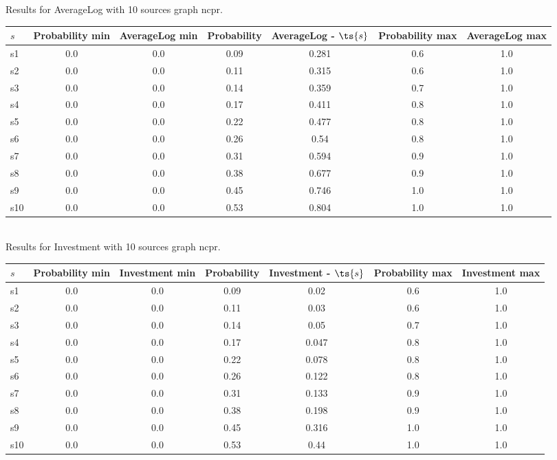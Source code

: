 \documentclass{article}
\begin{document}
\noindent Results for AverageLog with 10 sources graph ncpr.

\noindent\begin{tabular}{|l|c|c|c|c|c|c|}
\hline
$s$& Probability min & AverageLog min & Probability & AverageLog - $\ts{s}$ & Probability max & AverageLog max\\
\hline
s1 &0.0 & 0.0 & 0.09 & 0.281 & 0.6 & 1.0\\
\hline
s2 &0.0 & 0.0 & 0.11 & 0.315 & 0.6 & 1.0\\
\hline
s3 &0.0 & 0.0 & 0.14 & 0.359 & 0.7 & 1.0\\
\hline
s4 &0.0 & 0.0 & 0.17 & 0.411 & 0.8 & 1.0\\
\hline
s5 &0.0 & 0.0 & 0.22 & 0.477 & 0.8 & 1.0\\
\hline
s6 &0.0 & 0.0 & 0.26 & 0.54 & 0.8 & 1.0\\
\hline
s7 &0.0 & 0.0 & 0.31 & 0.594 & 0.9 & 1.0\\
\hline
s8 &0.0 & 0.0 & 0.38 & 0.677 & 0.9 & 1.0\\
\hline
s9 &0.0 & 0.0 & 0.45 & 0.746 & 1.0 & 1.0\\
\hline
s10 &0.0 & 0.0 & 0.53 & 0.804 & 1.0 & 1.0\\
\hline
\end{tabular}\\

\noindent Results for Investment with 10 sources graph ncpr.

\noindent\begin{tabular}{|l|c|c|c|c|c|c|}
\hline
$s$& Probability min & Investment min & Probability & Investment - $\ts{s}$ & Probability max & Investment max\\
\hline
s1 &0.0 & 0.0 & 0.09 & 0.02 & 0.6 & 1.0\\
\hline
s2 &0.0 & 0.0 & 0.11 & 0.03 & 0.6 & 1.0\\
\hline
s3 &0.0 & 0.0 & 0.14 & 0.05 & 0.7 & 1.0\\
\hline
s4 &0.0 & 0.0 & 0.17 & 0.047 & 0.8 & 1.0\\
\hline
s5 &0.0 & 0.0 & 0.22 & 0.078 & 0.8 & 1.0\\
\hline
s6 &0.0 & 0.0 & 0.26 & 0.122 & 0.8 & 1.0\\
\hline
s7 &0.0 & 0.0 & 0.31 & 0.133 & 0.9 & 1.0\\
\hline
s8 &0.0 & 0.0 & 0.38 & 0.198 & 0.9 & 1.0\\
\hline
s9 &0.0 & 0.0 & 0.45 & 0.316 & 1.0 & 1.0\\
\hline
s10 &0.0 & 0.0 & 0.53 & 0.44 & 1.0 & 1.0\\
\hline
\end{tabular}\\
\end{document}

